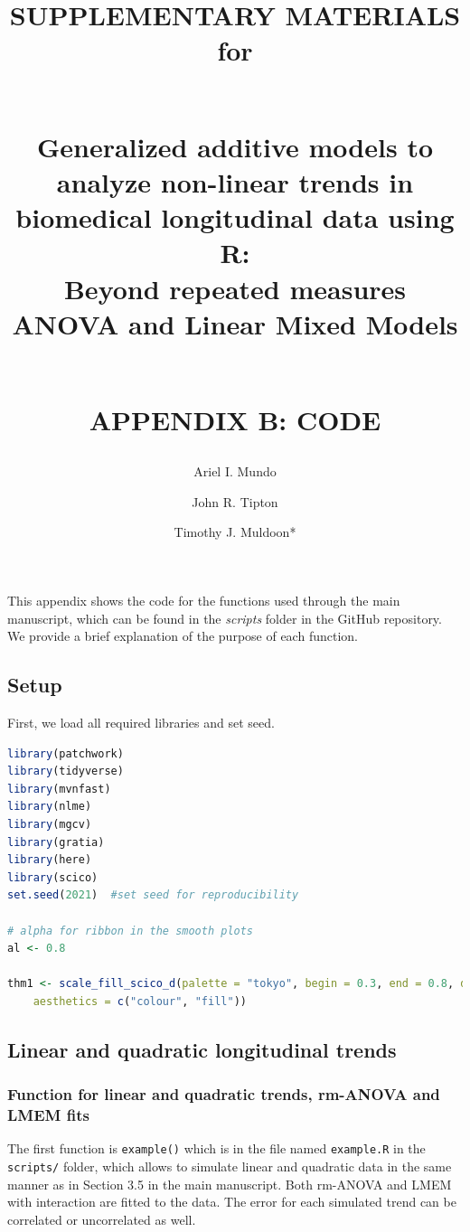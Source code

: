 \documentclass[
]{article}
\title{SUPPLEMENTARY MATERIALS for\\
\strut \\
\textbf{Generalized additive models to analyze non-linear trends in biomedical longitudinal data using R:}\\
Beyond repeated measures ANOVA and Linear Mixed Models\\
\strut \\
APPENDIX B: CODE}
\author{}
\date{\vspace{-2.5em}}
\author{Ariel I. Mundo \orcidaffila{}}
\author{John R. Tipton \orcidaffilb{}}
\author{Timothy J. Muldoon*}
\affil{tmuldoon@uark.edu}
\newcommand{\passthrough}[1]{#1}
\begin{document}
\maketitle

\newpage


This appendix shows the code for the functions used through the main manuscript, which can be found in the \emph{scripts} folder in the GitHub repository. We provide a brief explanation of the purpose of each function.

\hypertarget{setup}{%
\subsection{Setup}\label{setup}}

First, we load all required libraries and set seed.

\begin{lstlisting}[language=R]
library(patchwork)
library(tidyverse)
library(mvnfast)
library(nlme)
library(mgcv)
library(gratia)
library(here)
library(scico)
set.seed(2021)  #set seed for reproducibility

# alpha for ribbon in the smooth plots
al <- 0.8

thm1 <- scale_fill_scico_d(palette = "tokyo", begin = 0.3, end = 0.8, direction = -1,
    aesthetics = c("colour", "fill"))
\end{lstlisting}

\hypertarget{linear-and-quadratic-longitudinal-trends}{%
\subsection{Linear and quadratic longitudinal trends}\label{linear-and-quadratic-longitudinal-trends}}

\hypertarget{function-for-linear-and-quadratic-trends-rm-anova-and-lmem-fits}{%
\subsubsection{Function for linear and quadratic trends, rm-ANOVA and LMEM fits}\label{function-for-linear-and-quadratic-trends-rm-anova-and-lmem-fits}}

The first function is \passthrough{\lstinline!example()!} which is in the file named \passthrough{\lstinline!example.R!} in the \passthrough{\lstinline!scripts/!} folder, which allows to simulate linear and quadratic data in the same manner as in Section 3.5 in the main manuscript. Both rm-ANOVA and LMEM with interaction are fitted to the data. The error for each simulated trend can be correlated or uncorrelated as well.
\end{document}
